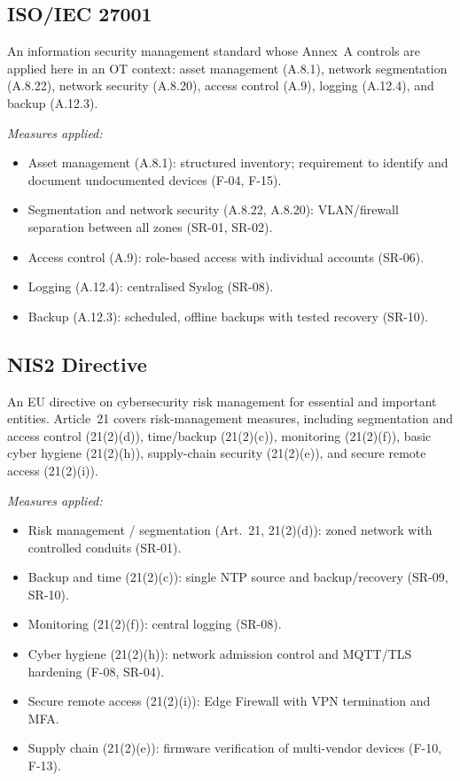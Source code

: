 \documentclass[11pt,a4paper]{article}
\begin{document}
\subsection{ISO/IEC 27001}
An information security management standard whose Annex~A controls are applied
here in an OT context: asset management (A.8.1), network segmentation (A.8.22),
network security (A.8.20), access control (A.9), logging (A.12.4), and backup
(A.12.3).

\textit{Measures applied:}
\begin{itemize}[nosep]
  \item Asset management (A.8.1): structured inventory; requirement to identify
      and document undocumented devices (F-04, F-15).

  \item Segmentation and network security (A.8.22, A.8.20): VLAN/firewall
      separation between all zones (SR-01, SR-02).

  \item Access control (A.9): role-based access with individual accounts
      (SR-06).

  \item Logging (A.12.4): centralised Syslog (SR-08).

  \item Backup (A.12.3): scheduled, offline backups with tested recovery
      (SR-10).
\end{itemize}

\subsection{NIS2 Directive}
An EU directive on cybersecurity risk management for essential and important
entities. Article~21 covers risk-management measures, including segmentation
and access control (21(2)(d)), time/backup (21(2)(c)), monitoring (21(2)(f)),
basic cyber hygiene (21(2)(h)), supply-chain security (21(2)(e)), and secure
remote access (21(2)(i)).

\textit{Measures applied:}
\begin{itemize}[nosep]
  \item Risk management / segmentation (Art.~21, 21(2)(d)): zoned network with
      controlled conduits (SR-01).

  \item Backup and time (21(2)(c)): single NTP source and backup/recovery
      (SR-09, SR-10).

  \item Monitoring (21(2)(f)): central logging (SR-08).

  \item Cyber hygiene (21(2)(h)): network admission control and MQTT/TLS
      hardening (F-08, SR-04).

  \item Secure remote access (21(2)(i)): Edge Firewall with VPN termination and
      MFA.

  \item Supply chain (21(2)(e)): firmware verification of multi-vendor devices
      (F-10, F-13).
\end{itemize}
\end{document}
